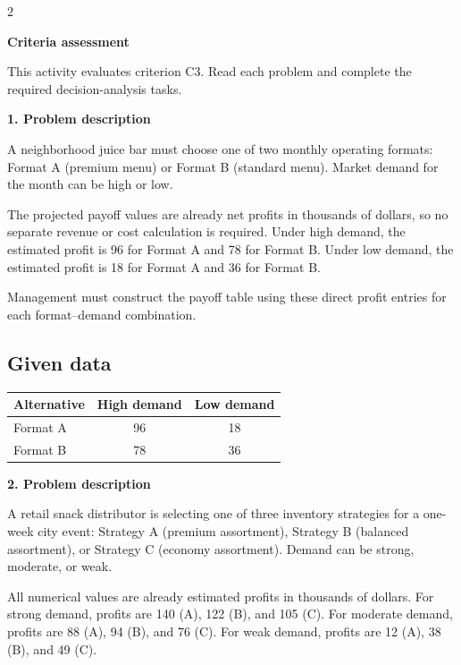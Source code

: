 \documentclass[12pt]{article}
\newcommand{\SubsectionBox}[1]{%
	\noindent\colorbox{gray!30}{%
		\parbox{\linewidth}{\textbf{#1}}%
	}\par\vspace{0.35cm}%
}
\begin{document}
	\begin{multicols}{2}
		\SubsectionBox{Criteria assessment}\vspace{-0.25cm}
		This activity evaluates criterion C3. Read each problem and complete the required decision-analysis tasks.

		\vspace{0.25cm}
		\SubsectionBox{1. Problem description}\vspace{-0.25cm}
		A neighborhood juice bar must choose one of two monthly operating formats: Format A (premium menu)
				or Format B (standard menu). Market demand for the month can be high or low.
				
				The projected payoff values are already net profits in thousands of dollars, so no separate revenue or cost calculation is required.
				Under high demand, the estimated profit is 96 for Format A and 78 for Format B. Under low demand, the estimated profit is 18 for Format A and 36 for Format B.
				
				Management must construct the payoff table using these direct profit entries for each format--demand combination.
				\subsection*{Given data}
				\begin{center}
					\begin{tabular}{l c c}
						\toprule
						Alternative & High demand & Low demand \\
						\midrule
						Format A & 96 & 18 \\
						Format B & 78 & 36 \\
						\bottomrule
					\end{tabular}
				\end{center}

		\vspace{0.25cm}
		\SubsectionBox{2. Problem description}\vspace{-0.25cm}
		A retail snack distributor is selecting one of three inventory strategies for a one-week city event: Strategy A (premium assortment),
				Strategy B (balanced assortment), or Strategy C (economy assortment). Demand can be strong, moderate, or weak.
				
				All numerical values are already estimated profits in thousands of dollars.
				For strong demand, profits are 140 (A), 122 (B), and 105 (C). For moderate demand, profits are 88 (A), 94 (B), and 76 (C).
				For weak demand, profits are 12 (A), 38 (B), and 49 (C).
				

\end{multicols}
\end{document}
